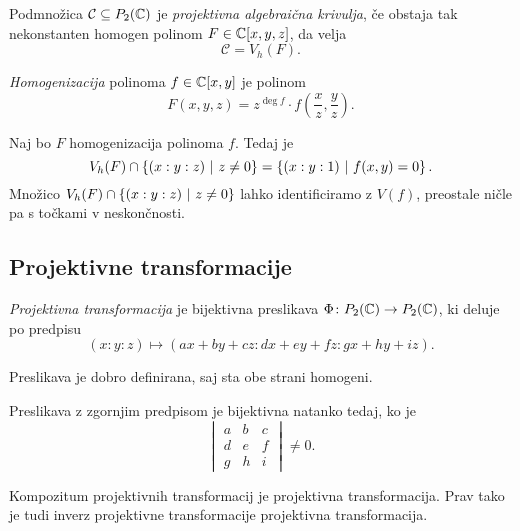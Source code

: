 \begin{definicija}
Podmnožica $\mathcal{C} \subseteq P_2(\mathbb{C})$ je
\emph{projektivna algebraična krivulja},
če obstaja tak nekonstanten homogen polinom $F \in \mathbb{C}[x, y, z]$,
da velja
\[
\mathcal{C} = V_h(F).
\]
\end{definicija}

\begin{definicija}
\emph{Homogenizacija} polinoma
$f \in \mathbb{C}[x,y]$ je polinom
\[
F(x, y, z) =
z^{\deg f} \cdot f\left(\frac{x}{z}, \frac{y}{z} \right).
\]
\end{definicija}


\begin{opomba}
Naj bo $F$ homogenizacija polinoma $f$. Tedaj je
\[
V_h(F) \cap \left\{(x : y : z)~\middle\vert~z \ne 0\right\} =
\left\{(x : y : 1)~\middle\vert~f(x, y) = 0\right\}.
\]
Množico $V_h(F) \cap \left\{(x : y : z)~\middle\vert~z \ne 0\right\}$ lahko
identificiramo z $V(f)$, preostale ničle pa s točkami v
neskončnosti.
\end{opomba}

\newpage

\subsection{Projektivne transformacije}

\begin{definicija}
\emph{Projektivna transformacija} je bijektivna preslikava
$\Phi \colon P_2(\mathbb{C}) \to P_2(\mathbb{C})$, ki deluje po predpisu
\[
(x : y : z) \mapsto (ax + by + cz : dx + ey + fz : gx + hy + iz).
\]
\end{definicija}

\begin{opomba}
Preslikava je dobro definirana, saj sta obe strani homogeni.
\end{opomba}

\begin{trditev}
Preslikava z zgornjim predpisom je bijektivna natanko tedaj, ko je
\[
\begin{vmatrix}
a & b & c \\
d & e & f \\
g & h & i
\end{vmatrix}
\ne 0.
\]
\end{trditev}

\obvs

\begin{opomba}
Kompozitum projektivnih transformacij je projektivna
transformacija. Prav tako je tudi inverz projektivne transformacije
projektivna transformacija.
\end{opomba}

